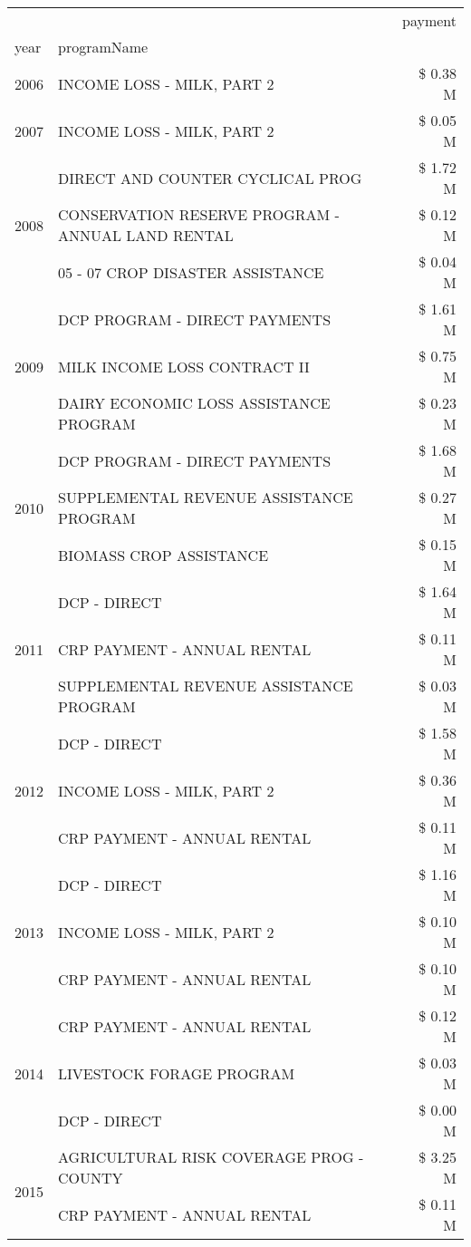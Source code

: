 \begin{tabular}{llr}
\toprule
 &  & payment \\
year & programName &  \\
\midrule
2006 & INCOME LOSS - MILK, PART 2 & \$ 0.38 M \\
\cline{1-3}
2007 & INCOME LOSS - MILK, PART 2 & \$ 0.05 M \\
\cline{1-3}
\multirow[t]{3}{*}{2008} & DIRECT AND COUNTER CYCLICAL PROG & \$ 1.72 M \\
 & CONSERVATION RESERVE PROGRAM - ANNUAL LAND RENTAL & \$ 0.12 M \\
 & 05 - 07 CROP DISASTER ASSISTANCE & \$ 0.04 M \\
\cline{1-3}
\multirow[t]{3}{*}{2009} & DCP PROGRAM - DIRECT PAYMENTS & \$ 1.61 M \\
 & MILK INCOME LOSS CONTRACT II & \$ 0.75 M \\
 & DAIRY ECONOMIC LOSS ASSISTANCE PROGRAM & \$ 0.23 M \\
\cline{1-3}
\multirow[t]{3}{*}{2010} & DCP PROGRAM - DIRECT PAYMENTS & \$ 1.68 M \\
 & SUPPLEMENTAL REVENUE ASSISTANCE PROGRAM & \$ 0.27 M \\
 & BIOMASS CROP ASSISTANCE & \$ 0.15 M \\
\cline{1-3}
\multirow[t]{3}{*}{2011} & DCP - DIRECT & \$ 1.64 M \\
 & CRP PAYMENT - ANNUAL RENTAL & \$ 0.11 M \\
 & SUPPLEMENTAL REVENUE ASSISTANCE PROGRAM & \$ 0.03 M \\
\cline{1-3}
\multirow[t]{3}{*}{2012} & DCP - DIRECT & \$ 1.58 M \\
 & INCOME LOSS - MILK, PART 2 & \$ 0.36 M \\
 & CRP PAYMENT - ANNUAL RENTAL & \$ 0.11 M \\
\cline{1-3}
\multirow[t]{3}{*}{2013} & DCP - DIRECT & \$ 1.16 M \\
 & INCOME LOSS - MILK, PART 2 & \$ 0.10 M \\
 & CRP PAYMENT - ANNUAL RENTAL & \$ 0.10 M \\
\cline{1-3}
\multirow[t]{3}{*}{2014} & CRP PAYMENT - ANNUAL RENTAL & \$ 0.12 M \\
 & LIVESTOCK FORAGE PROGRAM & \$ 0.03 M \\
 & DCP - DIRECT & \$ 0.00 M \\
\cline{1-3}
\multirow[t]{2}{*}{2015} & AGRICULTURAL RISK COVERAGE PROG - COUNTY & \$ 3.25 M \\
 & CRP PAYMENT - ANNUAL RENTAL & \$ 0.11 M \\

\end{tabular}
